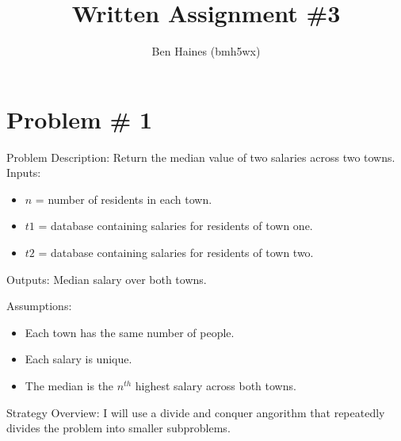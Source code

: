 \documentclass{article}
\begin{document}
\title{Written Assignment \#3}
\author{Ben Haines (bmh5wx)}

\section*{Problem \# 1}
Problem Description: Return the median value of two salaries across two towns.\\

Inputs:
\begin{itemize}
    \item $n$ = number of residents in each town.
    \item $t1$ = database containing salaries for residents of town one.
    \item $t2$ = database containing salaries for residents of town two.
\end{itemize}

Outputs: Median salary over both towns.

Assumptions:
\begin{itemize}
    \item Each town has the same number of people.
    \item Each salary is unique.
    \item The median is the $n^{th}$ highest salary across both towns. 
\end{itemize}

Strategy Overview:
I will use a divide and conquer angorithm that repeatedly divides the problem into smaller subproblems.\\
\end{document}
